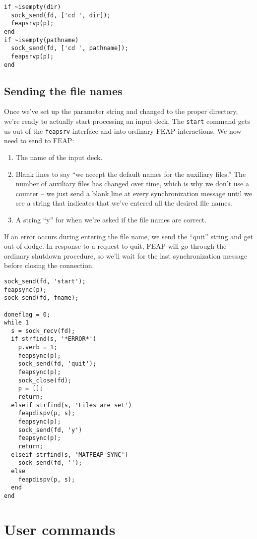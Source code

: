 \begin{verbatim}
if ~isempty(dir)
  sock_send(fd, ['cd ', dir]);
  feapsrvp(p);
end
if ~isempty(pathname)
  sock_send(fd, ['cd ', pathname]);
  feapsrvp(p);
end

\end{verbatim}
\subsection{Sending the file names}

Once we've set up the parameter string and changed to the proper
directory, we're ready to actually start processing an input
deck.  The {\tt start} command gets us out of the {\tt feapsrv}
interface and into ordinary FEAP interactions.  We now need to
send to FEAP:
\begin{enumerate}
\item
The name of the input deck.
\item
Blank lines to say ``we accept the default names for the
auxiliary files.''  The number of auxiliary files has changed
over time, which is why we don't use a counter -- we just send
a blank line at every synchronization message until we see a
string that indicates that we've entered all the desired file
names.
\item
A string ``y'' for when we're asked if the file names are
correct.
\end{enumerate}

If an error occurs during entering the file name, we send the
``quit'' string and get out of dodge.  In response to a request
to quit, FEAP will go through the ordinary shutdown procedure,
so we'll wait for the last synchronization message before closing
the connection.

\begin{verbatim}
sock_send(fd, 'start');
feapsync(p);
sock_send(fd, fname);

doneflag = 0;
while 1
  s = sock_recv(fd);
  if strfind(s, '*ERROR*')
    p.verb = 1;
    feapsync(p);
    sock_send(fd, 'quit');
    feapsync(p);
    sock_close(fd);
    p = [];
    return;
  elseif strfind(s, 'Files are set')
    feapdispv(p, s);
    feapsync(p);
    sock_send(fd, 'y')
    feapsync(p);
    return;
  elseif strfind(s, 'MATFEAP SYNC')
    sock_send(fd, '');
  else
    feapdispv(p, s);
  end
end
\end{verbatim}
\section {User commands}

